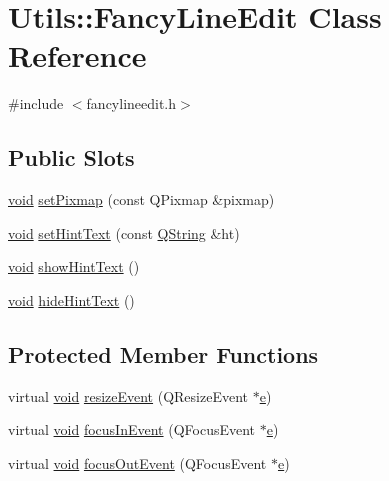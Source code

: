 \hypertarget{class_utils_1_1_fancy_line_edit}{\section{\-Utils\-:\-:\-Fancy\-Line\-Edit \-Class \-Reference}
\label{class_utils_1_1_fancy_line_edit}
}


{\ttfamily \#include $<$fancylineedit.\-h$>$}

\subsection*{\-Public \-Slots}
\begin{DoxyCompactItemize}
\item 
\hyperlink{group___u_a_v_objects_plugin_ga444cf2ff3f0ecbe028adce838d373f5c}{void} \hyperlink{class_utils_1_1_fancy_line_edit_a610964702a440c6b70f3e2678bbc3760}{set\-Pixmap} (const \-Q\-Pixmap \&pixmap)
\item 
\hyperlink{group___u_a_v_objects_plugin_ga444cf2ff3f0ecbe028adce838d373f5c}{void} \hyperlink{class_utils_1_1_fancy_line_edit_a87b41aad6173d35035122775a73ff9e6}{set\-Hint\-Text} (const \hyperlink{group___u_a_v_objects_plugin_gab9d252f49c333c94a72f97ce3105a32d}{\-Q\-String} \&ht)
\item 
\hyperlink{group___u_a_v_objects_plugin_ga444cf2ff3f0ecbe028adce838d373f5c}{void} \hyperlink{class_utils_1_1_fancy_line_edit_ad7361e3077f05840dcc003e7453bbecc}{show\-Hint\-Text} ()
\item 
\hyperlink{group___u_a_v_objects_plugin_ga444cf2ff3f0ecbe028adce838d373f5c}{void} \hyperlink{class_utils_1_1_fancy_line_edit_a27d8e4a441c920eb4e683a365fe45dbc}{hide\-Hint\-Text} ()
\end{DoxyCompactItemize}
\subsection*{\-Protected \-Member \-Functions}
\begin{DoxyCompactItemize}
\item 
virtual \hyperlink{group___u_a_v_objects_plugin_ga444cf2ff3f0ecbe028adce838d373f5c}{void} \hyperlink{class_utils_1_1_fancy_line_edit_a49efc731439c4353d92ce89263902418}{resize\-Event} (\-Q\-Resize\-Event $\ast$\hyperlink{_o_p_plots_8m_a9425be9aab51621e317ba7ade564b570}{e})
\item 
virtual \hyperlink{group___u_a_v_objects_plugin_ga444cf2ff3f0ecbe028adce838d373f5c}{void} \hyperlink{class_utils_1_1_fancy_line_edit_a04f34f807165a23f097eab49bfbc1677}{focus\-In\-Event} (\-Q\-Focus\-Event $\ast$\hyperlink{_o_p_plots_8m_a9425be9aab51621e317ba7ade564b570}{e})
\item 
virtual \hyperlink{group___u_a_v_objects_plugin_ga444cf2ff3f0ecbe028adce838d373f5c}{void} \hyperlink{class_utils_1_1_fancy_line_edit_a2d84ed54e0b9875ac4b20ef7b8be5483}{focus\-Out\-Event} (\-Q\-Focus\-Event $\ast$\hyperlink{_o_p_plots_8m_a9425be9aab51621e317ba7ade564b570}{e})
\end{DoxyCompactItemize}


